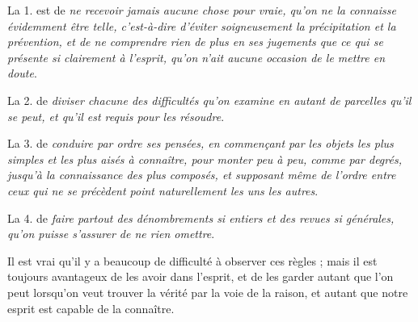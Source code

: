 La 1. est de \emph{ne recevoir jamais aucune chose pour vraie, qu'on ne la connaisse évidemment être telle, c'est-à-dire d'éviter soigneusement la précipitation et la prévention, et de ne comprendre rien de plus en ses jugements que ce qui se présente si clairement à l'esprit, qu'on n'ait aucune occasion de le mettre en doute}.

La 2. de \emph{diviser chacune des difficultés qu'on examine en autant de parcelles qu'il se peut, et qu'il est requis pour les résoudre}.

La 3. de \emph{conduire par ordre ses pensées, en commençant par les objets les plus simples et les plus aisés à connaître, pour monter peu à peu, comme par degrés, jusqu'à la connaissance des plus composés, et supposant même de l'ordre entre ceux qui ne se précèdent point naturellement les uns les autres}.

La 4. de \emph{faire partout des dénombrements si entiers et des revues si générales, qu'on puisse s'assurer de ne rien omettre}.

Il est vrai qu'il y a beaucoup de difficulté à observer ces règles ; mais il est toujours avantageux de les avoir dans l'esprit, et de les garder autant que l'on peut lorsqu'on veut trouver la vérité par la voie de la raison, et autant que notre esprit est capable de la connaître.


